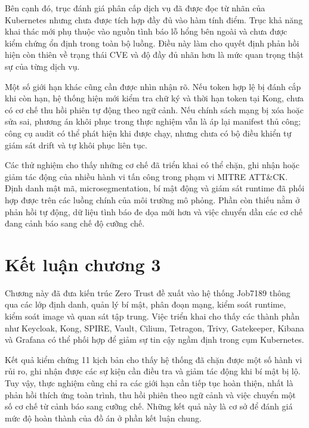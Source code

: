 Bên cạnh đó, trục đánh giá phân cấp dịch vụ đã được đọc từ nhãn của Kubernetes nhưng chưa được tích hợp đầy đủ vào hàm tính điểm. Trục khả năng khai thác mới phụ thuộc vào nguồn tình báo lỗ hổng bên ngoài và chưa được kiểm chứng ổn định trong toàn bộ luồng. Điều này làm cho quyết định phản hồi hiện còn thiên về trạng thái CVE và độ đầy đủ nhãn hơn là mức quan trọng thật sự của từng dịch vụ.

Một số giới hạn khác cũng cần được nhìn nhận rõ. Nếu token hợp lệ bị đánh cắp khi còn hạn, hệ thống hiện mới kiểm tra chữ ký và thời hạn token tại Kong, chưa có cơ chế thu hồi phiên tự động theo ngữ cảnh. Nếu chính sách mạng bị xóa hoặc sửa sai, phương án khôi phục trong thực nghiệm vẫn là áp lại manifest thủ công; công cụ audit có thể phát hiện khi được chạy, nhưng chưa có bộ điều khiển tự giám sát drift và tự khôi phục liên tục.

Các thử nghiệm cho thấy những cơ chế đã triển khai có thể chặn, ghi nhận hoặc giảm tác động của nhiều hành vi tấn công trong phạm vi MITRE ATT\&CK. Định danh mật mã, microsegmentation, bí mật động và giám sát runtime đã phối hợp được trên các luồng chính của môi trường mô phỏng. Phần còn thiếu nằm ở phản hồi tự động, dữ liệu tình báo đe dọa mới hơn và việc chuyển dần các cơ chế đang cảnh báo sang chế độ cưỡng chế.

\section{Kết luận chương 3}

Chương này đã đưa kiến trúc Zero Trust đề xuất vào hệ thống Job7189 thông qua các lớp định danh, quản lý bí mật, phân đoạn mạng, kiểm soát runtime, kiểm soát image và quan sát tập trung. Việc triển khai cho thấy các thành phần như Keycloak, Kong, SPIRE, Vault, Cilium, Tetragon, Trivy, Gatekeeper, Kibana và Grafana có thể phối hợp để giảm sự tin cậy ngầm định trong cụm Kubernetes.

Kết quả kiểm chứng 11 kịch bản cho thấy hệ thống đã chặn được một số hành vi rủi ro, ghi nhận được các sự kiện cần điều tra và giảm tác động khi bí mật bị lộ. Tuy vậy, thực nghiệm cũng chỉ ra các giới hạn cần tiếp tục hoàn thiện, nhất là phản hồi thích ứng toàn trình, thu hồi phiên theo ngữ cảnh và việc chuyển một số cơ chế từ cảnh báo sang cưỡng chế. Những kết quả này là cơ sở để đánh giá mức độ hoàn thành của đồ án ở phần kết luận chung.
